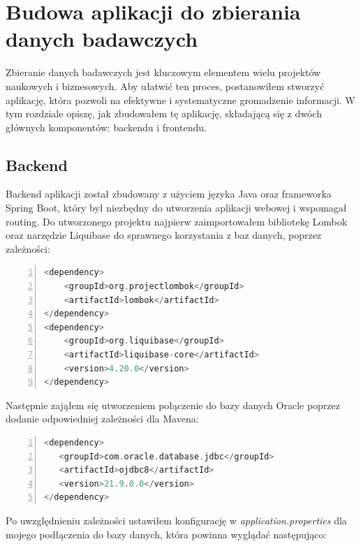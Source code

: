 \chapter{Budowa aplikacji do zbierania danych badawczych}

Zbieranie danych badawczych jest kluczowym elementem wielu projektów naukowych i biznesowych. Aby ułatwić ten proces, postanowiłem stworzyć aplikację, która pozwoli na efektywne i systematyczne gromadzenie informacji. W tym rozdziale opiszę, jak zbudowałem tę aplikację, składającą się z dwóch głównych komponentów: backendu i frontendu.

\section{Backend}

Backend aplikacji został zbudowany z użyciem języka Java oraz frameworka Spring Boot, który był niezbędny do utworzenia aplikacji webowej i wspomagał routing.
Do utworzonego projektu najpierw zaimportowałem bibliotekę Lombok oraz narzędzie Liquibase do sprawnego korzystania z baz danych, poprzez zależności:
\begin{lstlisting}[language=C, mathescape, frame=single, numbers=left, xleftmargin=2em, framexleftmargin=2em, basicstyle=\ttfamily\bfseries, caption={Zależnosci dla Lomboka i Liquibase}, label={Zależnosci dla Lomboka i Liquibas}]
<dependency>
    <groupId>org.projectlombok</groupId>
    <artifactId>lombok</artifactId>
</dependency>
<dependency>
    <groupId>org.liquibase</groupId>
    <artifactId>liquibase-core</artifactId>
    <version>4.20.0</version>
</dependency>      
\end{lstlisting}

Następnie zająłem się utworzeniem połączenie do bazy danych Oracle poprzez dodanie odpowiedniej zależności dla Mavena:
\begin{lstlisting}[language=C, mathescape, frame=single, numbers=left, xleftmargin=2em, framexleftmargin=2em, basicstyle=\ttfamily\bfseries, caption={Zależnosci dla Oracle database}, label={Zależnosci dla Oracle database}]
<dependency>
   <groupId>com.oracle.database.jdbc</groupId>
   <artifactId>ojdbc8</artifactId>
   <version>21.9.0.0</version>
</dependency>
\end{lstlisting}
Po uwzględnieniu zależności ustawiłem konfigurację w \textit{application.properties} dla mojego podłączenia do bazy danych, która powinna wyglądać następująco:

